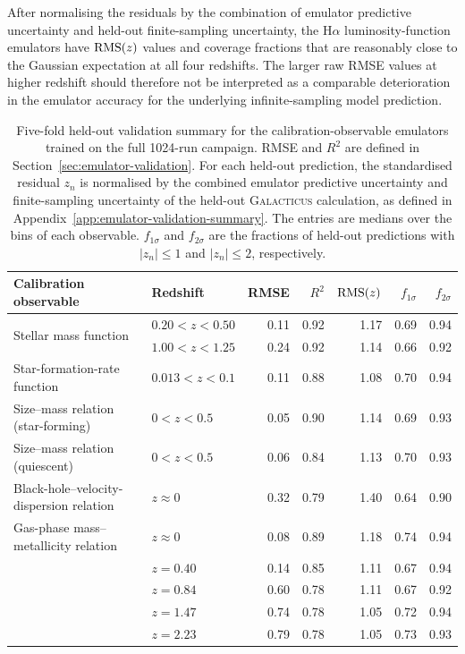 \documentclass[twocolumn, apj, numberedappendix, iop]{openjournal}
\newcommand{\galacticus}{\textsc{Galacticus}\xspace}
\newcommand{\ha}{H$\alpha$}
\begin{document}
After normalising the residuals by the combination of emulator predictive
uncertainty and held-out finite-sampling uncertainty, the \ha{}
luminosity-function emulators have ${\rm RMS}(z)$ values and coverage fractions
that are reasonably close to the Gaussian expectation at all four redshifts. The
larger raw RMSE values at higher redshift should therefore not be interpreted as
a comparable deterioration in the emulator accuracy for the underlying
infinite-sampling model prediction.

\begin{table}
\centering
\caption{
Five-fold held-out validation summary for the calibration-observable
emulators trained on the full 1024-run campaign.
RMSE and $R^2$ are defined in Section~\ref{sec:emulator-validation}.
For each held-out prediction, the standardised residual $z_n$ is normalised
by the combined emulator predictive uncertainty and finite-sampling uncertainty
of the held-out \galacticus{} calculation, as defined in
Appendix~\ref{app:emulator-validation-summary}.
The entries are medians over the bins of each observable.
$f_{1\sigma}$ and $f_{2\sigma}$ are the fractions of held-out predictions
with $\lvert z_n\rvert\leq1$ and $\lvert z_n\rvert\leq2$, respectively.
}
\label{tab:emulator-validation-summary}
\begin{tabular}{@{}p{}p{}rrrrr@{}}
\toprule
Calibration observable
  & Redshift
  & RMSE
  & $R^2$
  & ${\rm RMS}(z)$
  & $f_{1\sigma}$
  & $f_{2\sigma}$ \\
\midrule

\multirow{2}{0.3\textwidth}{Stellar mass function}
  & $0.20<z<0.50$ & 0.11 & 0.92 & 1.17 & 0.69 & 0.94 \\
  & $1.00<z<1.25$ & 0.24 & 0.92 & 1.14 & 0.66 & 0.92 \\
\addlinespace[0.5em]

Star-formation-rate function
  & $0.013<z<0.1$ & 0.11 & 0.88 & 1.08 & 0.70 & 0.94 \\
\addlinespace[0.5em]

Size--mass relation (star-forming)
  & $0<z<0.5$ & 0.05 & 0.90 & 1.14 & 0.69 & 0.93 \\

Size--mass relation (quiescent)
  & $0<z<0.5$ & 0.06 & 0.84 & 1.13 & 0.70 & 0.93 \\
\addlinespace[0.5em]

Black-hole--velocity-dispersion relation
  & $z\approx0$ & 0.32 & 0.79 & 1.40 & 0.64 & 0.90 \\
\addlinespace[0.5em]

Gas-phase mass--metallicity relation
  & $z\approx0$ & 0.08 & 0.89 & 1.18 & 0.74 & 0.94 \\
\addlinespace[0.5em]

\multirow{4}{0.3\textwidth}{\ha{} luminosity function}
  & $z=0.40$ & 0.14 & 0.85 & 1.11 & 0.67 & 0.94 \\
  & $z=0.84$ & 0.60 & 0.78 & 1.11 & 0.67 & 0.92 \\
  & $z=1.47$ & 0.74 & 0.78 & 1.05 & 0.72 & 0.94 \\
  & $z=2.23$ & 0.79 & 0.78 & 1.05 & 0.73 & 0.93 \\
\bottomrule
\end{tabular}
\end{table}
\end{document}
